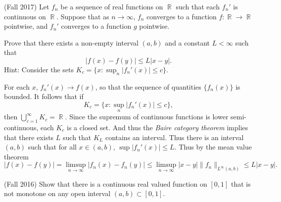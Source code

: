 \documentclass[answers]{exam}
\DeclareMathOperator{\RR}{\mathbb{R}}
\theoremstyle{problemstyle}
\newcommand{\norm}[1]{\left\lVert#1\right\rVert} %
\newcommand{\1}[1]{\textbf{1}_{\left[#1\right]}} %
\def\Q{\mathbb{Q}} %
\begin{document}
\begin{questions}
\question (Fall 2017) Let $f_n$ be a sequence of real functions on $\RR$ such that each $f_n'$ is continuous on $\RR$. Suppose that as $n \to \infty$, $f_n$ converges to a function $f: \RR \to \RR$ pointwise, and $f_n'$ converges to a function $g$ pointwise.

Prove that there exists a non-empty interval $(a,b)$ and a constant $L < \infty$ such that
%
\[ |f(x) - f(y)| \leq L |x-y|. \]
%
Hint: Consider the sets $K_c = \{ x: \sup_n |f_n'(x)| \leq c \}$.
\begin{solution}
    For each $x$, $f_n'(x) \to f(x)$, so that the sequence of quantities $\{ f_n(x) \}$ is bounded. It follows that if
    \[ K_c = \{ x : \sup_n |f_n'(x)| \leq c \}, \]
    then $\bigcup_{c = 1}^\infty K_c = \RR$. Since the supremum of continuous functions is lower semi-continuous, each $K_c$ is a closed set. And thus the \emph{Baire category theorem} implies that there exists $L$ such that $K_L$ contains an interval. Thus there is an interval $(a,b)$ such that for all $x \in (a,b)$, $\sup |f_n'(x)| \leq L$. Thus by the mean value theorem
    \[ |f(x) - f(y)| = \limsup_{n \to \infty} |f_n(x) - f_n(y)| \leq \limsup_{n \to \infty} |x - y| \| f_n \|_{L^\infty(a,b)} \leq L |x - y|. \]
\end{solution}

\item (Fall 2016) Show that there is a continuous real valued function on $[0,1]$ that is not monotone on any open interval $(a,b)\subset [0,1]$.

  


\end{questions}
\end{document}

